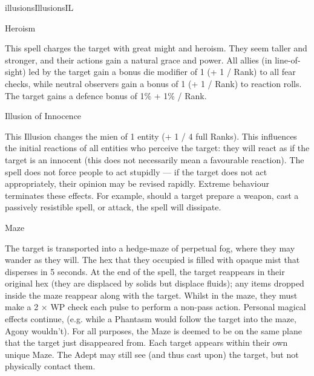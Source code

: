 \begin{College}[1.5]{illusions}{Illusions}{IL}
\begin{spell}[S-8]{Heroism}

\begin{effects}
This spell charges the target with great might and heroism.  They seem
taller and stronger, and their actions gain a natural grace and power.
All allies (in line-of-sight) led by the target gain a bonus die
modifier of 1 (+ 1 / Rank) to all fear checks, while neutral observers
gain a bonus of 1 (+ 1 / Rank) to reaction rolls.  The target gains a
defence bonus of 1\% + 1\% / Rank.
\end{effects}
\end{spell}

\begin{spell}[S-9]{Illusion of Innocence}

\begin{effects}
This Illusion changes the mien of 1 entity (+ 1 / 4 full Ranks).  This
influences the initial reactions of all entities who perceive the
target: they will react as if the target is an innocent (this does not
necessarily mean a favourable reaction).  The spell does not force
people to act stupidly --- if the target does not act appropriately,
their opinion may be revised rapidly.  Extreme behaviour terminates
these effects.  For example, should a target prepare a weapon, cast a
passively resistible spell, or attack, the spell will dissipate.
\end{effects}
\end{spell}

\begin{spell}[S-10]{Maze}

\begin{effects}
The target is transported into a hedge-maze of perpetual fog, where
they may wander as they will.  The hex that they occupied is filled
with opaque mist that disperses in 5 seconds. At the end of the spell,
the target reappears in their original hex (they are displaced by
solids but displace fluids); any items dropped inside the maze
reappear along with the target.  Whilst in the maze, they must make a
2 × WP check each pulse to perform a non-pass action. Personal magical
effects continue, (e.g. while a Phantasm would follow the target into
the maze, Agony wouldn’t).  For all purposes, the Maze is deemed to be
on the same plane that the target just disappeared from.  Each target
appears within their own unique Maze. The Adept may still see (and
thus cast upon) the target, but not physically contact them.
\end{effects}
\end{spell}


\end{College}
